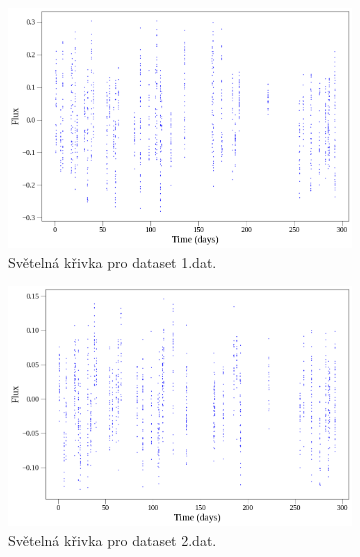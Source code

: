 \documentclass[a4paper,11pt,twocolumn]{article}
\begin{document}
    \begin{figure}%
        \centering
        \begin{subfigure}[t]{0.48\textwidth}
            \centering
            \includegraphics[width=\textwidth]{lc/1_lc.png}
            \caption{Světelná křivka pro dataset 1.dat.}
            \label{fig:1_lc}
        \end{subfigure}
        \hfill
        \begin{subfigure}[t]{0.48\textwidth}
            \centering
            \includegraphics[width=\textwidth]{lc/2_lc.png}
            \caption{Světelná křivka pro dataset 2.dat.}
            \label{fig:2_lc}
        \end{subfigure}
        \hfill
        \begin{subfigure}[t]{0.48\textwidth}

\end{subfigure}
\end{figure}
\end{document}
